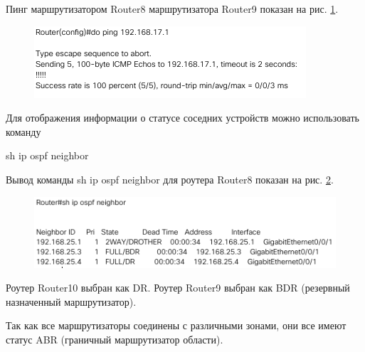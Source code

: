 \documentclass[a4paper,14pt]{extreport} %
\begin{document}
Пинг маршрутизатором Router8 маршрутизатора Router9 показан на рис. \ref{fig:ping4}.

\begin{figure}[H]
	\centering
	\includegraphics[width=1\linewidth]{ping4}
	\caption{}
	\label{fig:ping4}
\end{figure}

Для отображения информации о статусе соседних устройств можно использовать команду

sh ip ospf neighbor 

Вывод команды sh ip ospf neighbor для роутера Router8 показан на рис. \ref{fig:st}.

\begin{figure}[H]
	\centering
	\includegraphics[width=1\linewidth]{st}
	\caption{}
	\label{fig:st}
\end{figure}

Роутер Router10 выбран как  DR. Роутер Router9 выбран как  BDR (резервный назначенный маршрутизатор). 

Так как все маршрутизаторы соединены с различными зонами, они все имеют статус ABR  (граничный маршрутизатор области).
\end{document}
